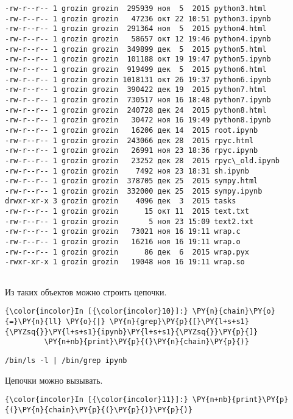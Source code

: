 \begin{Verbatim}[commandchars=\\\{\}]
-rw-r--r-- 1 grozin grozin  295939 ноя  5  2015 python3.html
-rw-r--r-- 1 grozin grozin   47236 окт 22 10:51 python3.ipynb
-rw-r--r-- 1 grozin grozin  291364 ноя  5  2015 python4.html
-rw-r--r-- 1 grozin grozin   58657 окт 12 19:46 python4.ipynb
-rw-r--r-- 1 grozin grozin  349899 дек  5  2015 python5.html
-rw-r--r-- 1 grozin grozin  101188 окт 19 19:47 python5.ipynb
-rw-r--r-- 1 grozin grozin  919499 дек  5  2015 python6.html
-rw-r--r-- 1 grozin grozin 1018131 окт 26 19:37 python6.ipynb
-rw-r--r-- 1 grozin grozin  390422 дек 19  2015 python7.html
-rw-r--r-- 1 grozin grozin  730517 ноя 16 18:48 python7.ipynb
-rw-r--r-- 1 grozin grozin  240728 дек 24  2015 python8.html
-rw-r--r-- 1 grozin grozin   30472 ноя 16 19:49 python8.ipynb
-rw-r--r-- 1 grozin grozin   16206 дек 14  2015 root.ipynb
-rw-r--r-- 1 grozin grozin  243066 дек 28  2015 rpyc.html
-rw-r--r-- 1 grozin grozin   26991 ноя 23 18:36 rpyc.ipynb
-rw-r--r-- 1 grozin grozin   23252 дек 28  2015 rpyc\_old.ipynb
-rw-r--r-- 1 grozin grozin    7492 ноя 23 18:31 sh.ipynb
-rw-r--r-- 1 grozin grozin  378705 дек 25  2015 sympy.html
-rw-r--r-- 1 grozin grozin  332000 дек 25  2015 sympy.ipynb
drwxr-xr-x 3 grozin grozin    4096 дек  3  2015 tasks
-rw-r--r-- 1 grozin grozin      15 окт 11  2015 text.txt
-rw-r--r-- 1 grozin grozin       5 ноя 23 15:09 text2.txt
-rw-r--r-- 1 grozin grozin   73021 ноя 16 19:11 wrap.c
-rw-r--r-- 1 grozin grozin   16216 ноя 16 19:11 wrap.o
-rw-r--r-- 1 grozin grozin      86 дек  6  2015 wrap.pyx
-rwxr-xr-x 1 grozin grozin   19048 ноя 16 19:11 wrap.so


    \end{Verbatim}

    Из таких объектов можно строить цепочки.

    \begin{Verbatim}[commandchars=\\\{\}]
{\color{incolor}In [{\color{incolor}10}]:} \PY{n}{chain}\PY{o}{=}\PY{n}{ll} \PY{o}{|} \PY{n}{grep}\PY{p}{[}\PY{l+s+s1}{\PYZsq{}}\PY{l+s+s1}{ipynb}\PY{l+s+s1}{\PYZsq{}}\PY{p}{]}
         \PY{n+nb}{print}\PY{p}{(}\PY{n}{chain}\PY{p}{)}
\end{Verbatim}


    \begin{Verbatim}[commandchars=\\\{\}]
/bin/ls -l | /bin/grep ipynb

    \end{Verbatim}

    Цепочки можно вызывать.

    \begin{Verbatim}[commandchars=\\\{\}]
{\color{incolor}In [{\color{incolor}11}]:} \PY{n+nb}{print}\PY{p}{(}\PY{n}{chain}\PY{p}{(}\PY{p}{)}\PY{p}{)}
\end{Verbatim}


